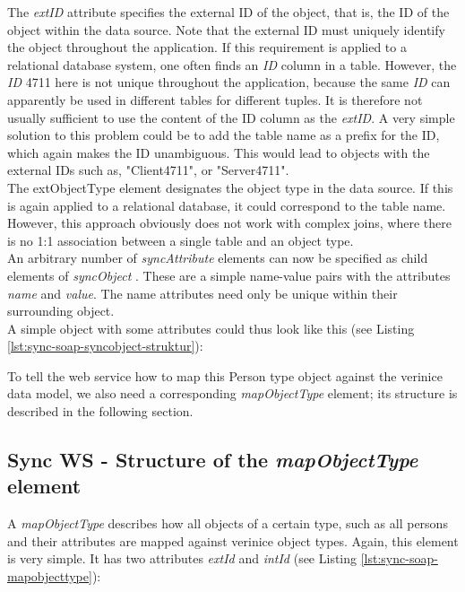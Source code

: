 \documentclass[a4paper,10pt]{book}
\begin{document}
The \textit{extID} attribute specifies the external ID of the object, that is, the ID of the object within the data source.
Note that the external ID must uniquely identify the object throughout the application. If this requirement is applied
to a relational database system, one often finds an \textit{ID} column in a table. However, the \textit{ID} 4711 here is not unique
throughout the application, because the same \textit{ID} can apparently be used in different tables for different tuples.
It is therefore not usually sufficient to use the content of the ID column as the \textit{extID}. A very simple solution
to this problem could be to add the table name as a prefix for the ID, which again makes the ID unambiguous. This would
lead to objects with the external IDs such as, "Client4711", or "Server4711".
\newline\\
The extObjectType element designates the object type in the data source. If this
is again applied to a relational database, it could correspond to the table name. However, this approach obviously does not work with complex joins,
where there is no 1:1 association between a single table and an object type.
\newline\\
An arbitrary number of \textit{syncAttribute} elements can now be specified as child elements of
\textit{syncObject} . These are a simple name-value pairs with the attributes \textit{name} and \textit{value}.
The name attributes need only be unique within their surrounding object.
\newline\\
A simple object with some attributes could thus look like this (see Listing \ref{lst:sync-soap-syncobject-struktur}):

\lstset{language=XML}


To tell the web service how to map this Person type object against the verinice data model, we also need a corresponding
\textit{mapObjectType} element; its structure is described in the following section.

\subsection{Sync WS - Structure of the \textit{mapObjectType} element}
A \textit{mapObjectType} describes how all objects of a certain type, such as all persons and their attributes
are mapped against verinice object types. Again, this element is very simple. It has two attributes \textit{extId} and
\textit{intId} (see Listing \ref{lst:sync-soap-mapobjecttype}):
\newline
\end{document}
